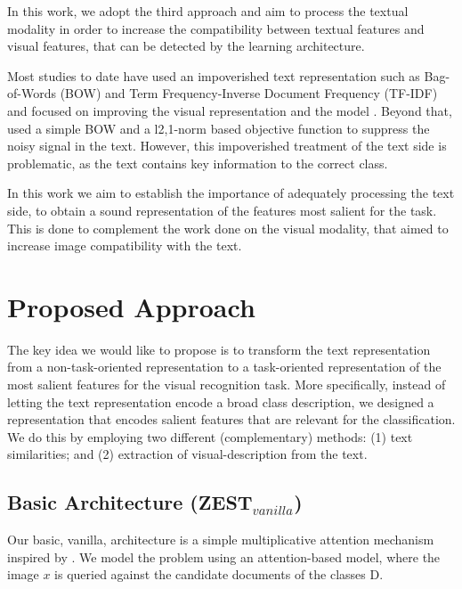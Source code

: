 \documentclass[11pt,a4paper]{article}
\begin{document}
In this work, we adopt the third approach and aim to process the textual modality in order to increase the compatibility between textual features and visual features, that can be detected by the learning architecture.
\par

Most studies to date have used an impoverished text representation such as Bag-of-Words (BOW) and Term Frequency-Inverse Document Frequency (TF-IDF) and focused on improving the visual representation and the model \cite{lei2015predicting,elhoseiny2013write,elhoseiny2016write,elhoseiny2017link,zhu2018generative}. Beyond that, \citet{qiao2016less} used a simple BOW and a l2,1-norm based objective function to suppress the noisy signal in the text. However, this impoverished treatment of the text side is problematic, as the text contains key information to the correct class. 

In this work we aim to establish the importance of adequately processing the text side, to obtain a sound representation of the features most salient for the task. This is done to complement the work done on the visual modality, that aimed to increase image compatibility with the text.





\section{Proposed Approach}
\label{task}

The key idea we would like to propose is to transform the text representation from a non-task-oriented representation to a task-oriented representation of the most salient features for the visual recognition task. More specifically, instead of letting the text representation encode a broad class description, we designed a representation that encodes salient features that are relevant for the classification. We do this by employing two different (complementary) methods: (1) text similarities; and (2) extraction of visual-description from the text.


\subsection{Basic Architecture (ZEST$_{vanilla}$)}
\label{section_ZEST_C}


Our basic, vanilla, architecture is a simple multiplicative attention mechanism \cite{luong2015effective} inspired by \citet{romera2015embarrassingly}. We model the problem using an attention-based model, where the image $x$ is queried
against the candidate documents of the classes D.
\end{document}
